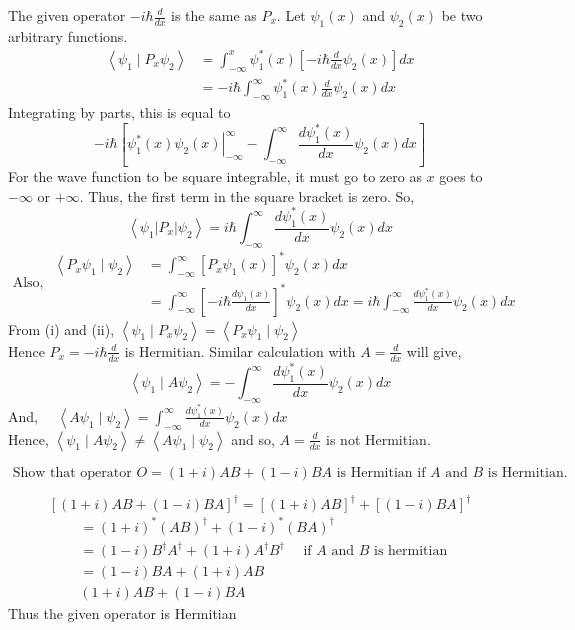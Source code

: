 \begin{answer}
 The given operator $-i \hbar \frac{d}{d x}$ is the same as $P_{x}$. Let $\psi_{1}(x)$ and $\psi_{2}(x)$ be two arbitrary functions.
$$
\begin{aligned}
\left\langle\psi_{1} \mid P_{x} \psi_{2}\right\rangle &=\int_{-\infty}^{x} \psi_{1}^{*}(x)\left[-i \hbar \frac{d}{d x} \psi_{2}(x)\right] d x \\
&=-i \hbar \int_{-\infty}^{\infty} \psi_{1}^{*}(x) \frac{d}{d x} \psi_{2}(x) d x
\end{aligned}
$$
Integrating by parts, this is equal to
$$
-i \hbar\left[\left.\psi_{1}^{*}(x) \psi_{2}(x)\right|_{-\infty} ^{\infty}-\int_{-\infty}^{\infty} \frac{d \psi_{1}^{*}(x)}{d x} \psi_{2}(x) d x\right]
$$
For the wave function to be square integrable, it must go to zero as $x$ goes to $-\infty$ or $+\infty$.
Thus, the first term in the square bracket is zero. So,
$$
\left\langle\psi_{1}\left|P_{x}\right| \psi_{2}\right\rangle=i \hbar \int_{-\infty}^{\infty} \frac{d \psi_{1}^{*}(x)}{d x} \psi_{2}(x) d x
$$
$$
\text { Also, } \begin{aligned}
\left\langle P_{x} \psi_{1} \mid \psi_{2}\right\rangle &=\int_{-\infty}^{\infty}\left[P_{x} \psi_{1}(x)\right]^{*} \psi_{2}(x) d x \\
&=\int_{-\infty}^{\infty}\left[-i \hbar \frac{d \psi_{1}(x)}{d x}\right]^{*} \psi_{2}(x) d x=i \hbar \int_{-\infty}^{\infty} \frac{d \psi_{1}^{*}(x)}{d x} \psi_{2}(x) d x
\end{aligned}
$$
From (i) and (ii), $\left\langle\psi_{1} \mid P_{x} \psi_{2}\right\rangle=\left\langle P_{x} \psi_{1} \mid \psi_{2}\right\rangle$\\
Hence $P_{x}=-i \hbar \frac{d}{d x}$ is Hermitian. Similar calculation with $A=\frac{d}{d x}$ will give,
$$
\left\langle\psi_{1} \mid A \psi_{2}\right\rangle=-\int_{-\infty}^{\infty} \frac{d \psi_{1}^{*}(x)}{d x} \psi_{2}(x) d x
$$
And, $\quad\left\langle A \psi_{1} \mid \psi_{2}\right\rangle=\int_{-\infty}^{\infty} \frac{d \psi_{1}^{*}(x)}{d x} \psi_{2}(x) d x$\\
Hence, $\left\langle\psi_{1} \mid A \psi_{2}\right\rangle \neq\left\langle A \psi_{1} \mid \psi_{2}\right\rangle$ and so, $A=\frac{d}{d x}$ is not Hermitian.	
\end{answer}
\begin{exercise}
	$\text { Show that operator } O=(1+i) A B+(1-i) B A \text { is Hermitian if } A \text { and } B \text { is Hermitian. }$
\end{exercise}
\begin{answer}
$$[(1+i) A B+(1-i) B A]^{\dagger}=[(1+i) A B]^{\dagger}+[(1-i) B A]^{\dagger}$$	
$$
\begin{aligned}
&=(1+i)^{*}(A B)^{\dagger}+(1-i)^{*}(B A)^{\dagger} \\
&=(1-i) B^{\dagger} A^{\dagger}+(1+i) A^{\dagger} B^{\dagger} \quad \text { if } A \text { and } B \text { is hermitian } \\
&=(1-i) B A+(1+i) A B \\
&(1+i) A B+(1-i) B A
\end{aligned}
$$
Thus the given operator is Hermitian
\end{answer}
